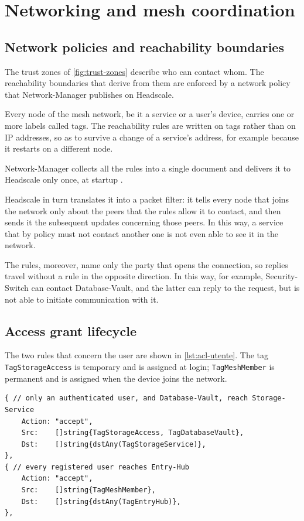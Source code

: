 \chapter{Networking and mesh coordination}
\label{chap:rete}

\section{Network policies and reachability boundaries}

The trust zones of \autoref{fig:trust-zones} describe who can contact whom. The reachability boundaries
that derive from them are enforced by a network policy that Network-Manager publishes on Headscale.

Every node of the mesh network, be it a service or a user's device, carries one or more labels
called tags. The reachability rules are written on tags rather than on IP addresses, so as to
survive a change of a service's address, for example because it restarts on a different node.

Network-Manager collects all the rules into a single document and delivers it to Headscale only once,
at startup \cite{ramusb-code-acl-policy}.

Headscale in turn translates it into a packet filter: it tells every node that joins the network only about the
peers that the rules allow it to contact, and then sends it the subsequent updates concerning those peers.
In this way, a service that by policy must not contact another one is not even able to
see it in the network.

The rules, moreover, name only the party that opens the connection, so replies travel without a rule
in the opposite direction. In this way, for example, Security-Switch can contact Database-Vault, and the latter
can reply to the request, but is not able to initiate communication with it.

\section{Access grant lifecycle}

The two rules that concern the user are shown in \autoref{lst:acl-utente}. The tag
\texttt{TagStorageAccess} is temporary and is assigned at login; \texttt{TagMeshMember} is permanent and
is assigned when the device joins the network.

\begin{lstlisting}[caption={The two rules that delimit the user's zones, from \texttt{policy.go}
\cite{ramusb-code-acl-policy}, with added comments.}, label={lst:acl-utente}]
{ // only an authenticated user, and Database-Vault, reach Storage-Service
    Action: "accept",
    Src:    []string{TagStorageAccess, TagDatabaseVault},
    Dst:    []string{dstAny(TagStorageService)},
},
{ // every registered user reaches Entry-Hub
    Action: "accept",
    Src:    []string{TagMeshMember},
    Dst:    []string{dstAny(TagEntryHub)},
},
\end{lstlisting}

